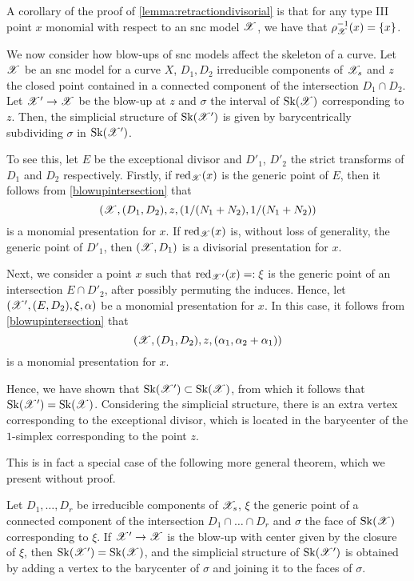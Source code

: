 A corollary of the proof of \cref{lemma:retractiondivisorial} is that for any type III point $x$ monomial with respect to an snc model $\mathscr{X}$, we have that $\rho_{\mathscr{X}}^{-1}(x) = \{x\}$. 

We now consider how blow-ups of snc models affect the skeleton of a curve.
Let $\mathscr{X}$ be an snc model for a curve $X$, $D_1, D_2$ irreducible components of $\mathscr{X}_s$ and $z$ the closed point contained in a connected component of the intersection $D_1 \cap D_2$.
Let $\mathscr{X}' \to \mathscr{X}$ be the blow-up at $z$ and $\sigma$ the interval of $\operatorname{Sk}(\mathscr{X})$ corresponding to $z$.
Then, the simplicial structure of $\operatorname{Sk}(\mathscr{X}')$ is given by barycentrically subdividing $\sigma$ in $\operatorname{Sk}(\mathscr{X}')$.

To see this, let $E$ be the exceptional divisor and $D'_1$, $D'_2$ the strict transforms of $D_1$ and $D_2$ respectively. 
Firstly, if $\operatorname{red}_{\mathscr{X}}(x)$ is the generic point of $E$, then it follows from \cref{blowupintersection} that 
    \[(\mathscr{X}, (D_1, D_2), z, (1/(N_1 + N_2), 1/(N_1 + N_2))\] 
is a monomial presentation for $x$. 
If $\operatorname{red}_{\mathscr{X}}(x)$ is, without loss of generality, the generic point of $D'_1$, then $(\mathscr{X}, D_1)$ is a divisorial presentation for $x$.

Next, we consider a point $x$ such that $\operatorname{red}_{\mathscr{X}'}(x) =: \xi$ is the generic point of an intersection $E \cap D'_2$, after possibly permuting the induces.
Hence, let $(\mathscr{X}', (E, D_2), \xi, \alpha)$ be a monomial presentation for $x$.
In this case, it follows from \cref{blowupintersection} that 
\[(\mathscr{X}, (D_1, D_2), z, (\alpha_1, \alpha_2 + \alpha_1))\] is a monomial presentation for $x$.
    
Hence, we have shown that $\operatorname{Sk}(\mathscr{X}') \subset \operatorname{Sk}(\mathscr{X})$, from which it follows that $\operatorname{Sk}(\mathscr{X}') = \operatorname{Sk}(\mathscr{X})$. 
Considering the simplicial structure, there is an extra vertex corresponding to the exceptional divisor, which is located in the barycenter of the $1$-simplex corresponding to the point $z$.

This is in fact a special case of the following more general theorem, which we present without proof. 

\begin{prop}\label{blowupintersectionskeleton}\parencite[Prop. 3.1.9]{MN}
    Let $D_1, \dots, D_r$ be irreducible components of $\mathscr{X}_s$, $\xi$ the generic point of a connected component of the intersection $D_1 \cap \dots \cap D_r$ and $\sigma$ the face of $\operatorname{Sk}(\mathscr{X})$ corresponding to $\xi$. If $\mathscr{X}' \to \mathscr{X}$ is the blow-up with center given by the closure of $\xi$, then $\operatorname{Sk}(\mathscr{X}') = \operatorname{Sk}(\mathscr{X})$, and the simplicial structure of $\operatorname{Sk}(\mathscr{X}')$ is obtained by adding a vertex to the barycenter of $\sigma$ and joining it to the faces of $\sigma$.
\end{prop}

